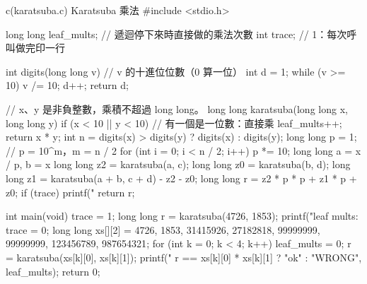 \begin{example}[label=ex:dc-karatsuba]{c}{(karatsuba.c) Karatsuba 乘法}
#include <stdio.h>

long long leaf_mults;                   // 遞迴停下來時直接做的乘法次數
int trace;                              // 1：每次呼叫做完印一行

int digits(long long v)                 // v 的十進位位數（0 算一位）
{
    int d = 1;
    while (v >= 10) {
        v /= 10;
        d++;
    }
    return d;
}

// x、y 是非負整數，乘積不超過 long long。
long long karatsuba(long long x, long long y)
{
    if (x < 10 || y < 10) {             // 有一個是一位數：直接乘
        leaf_mults++;
        return x * y;
    }
    int n = digits(x) > digits(y) ? digits(x) : digits(y);
    long long p = 1;                    // p = 10^m，m = n / 2
    for (int i = 0; i < n / 2; i++) {
        p *= 10;
    }
    long long a = x / p, b = x %
    long long z2 = karatsuba(a, c);
    long long z0 = karatsuba(b, d);
    long long z1 = karatsuba(a + b, c + d) - z2 - z0;
    long long r = z2 * p * p + z1 * p + z0;
    if (trace) {
        printf("%
    }
    return r;
}

int main(void)
{
    trace = 1;
    long long r = karatsuba(4726, 1853);
    printf("leaf mults: %
    trace = 0;
    long long xs[][2] = {{4726, 1853}, {31415926, 27182818}, {99999999, 99999999},
                         {123456789, 987654321}};
    for (int k = 0; k < 4; k++) {
        leaf_mults = 0;
        r = karatsuba(xs[k][0], xs[k][1]);
        printf("%
               r == xs[k][0] * xs[k][1] ? "ok" : "WRONG", leaf_mults);
    }
    return 0;
}
\end{example}

